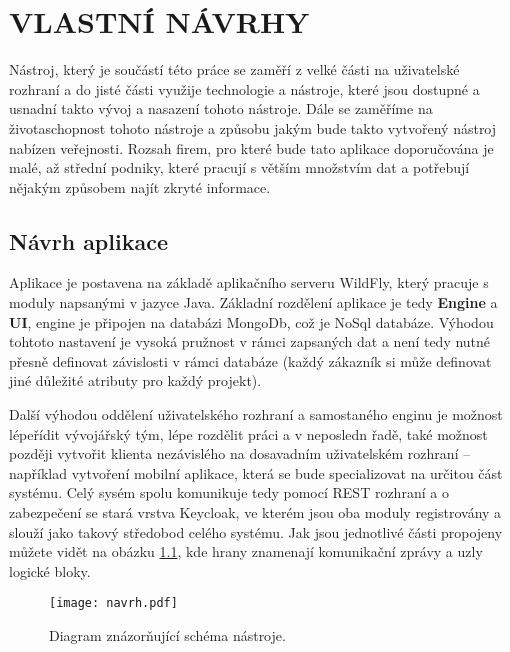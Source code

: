 \chapter{VLASTNÍ NÁVRHY}
\par Nástroj, který je součástí této práce se zaměří z velké části na uživatelské rozhraní a do jisté části využije technologie a nástroje, které jsou dostupné a usnadní takto vývoj a nasazení tohoto nástroje. Dále se zaměříme na životaschopnost tohoto nástroje a způsobu jakým bude takto vytvořený nástroj nabízen veřejnosti. Rozsah firem, pro které bude tato aplikace doporučována je malé, až střední podniky, které pracují s větším množstvím dat a potřebují nějakým způsobem najít zkryté informace.

\section{Návrh aplikace}
\par Aplikace je postavena na základě aplikačního serveru WildFly, který pracuje s moduly napsanými v jazyce Java. Základní rozdělení aplikace je tedy \textbf{Engine} a \textbf{UI}, engine je připojen na databázi MongoDb, což je NoSql databáze. Výhodou tohtoto nastavení je vysoká pružnost v rámci zapsaných dat a není tedy nutné  přesně definovat závislosti v rámci databáze (každý zákazník si může definovat jiné důležité atributy pro každý projekt).
\par Další výhodou oddělení uživatelského rozhraní a samostaného enginu je možnost lépeřídit vývojářský tým, lépe rozdělit práci a v neposledn řadě, také možnost později vytvořit klienta nezávislého na dosavadním uživatelském rozhraní -- například vytvoření mobilní aplikace, která se bude specializovat na určitou část systému. Celý sysém spolu komunikuje tedy pomocí REST rozhraní a o zabezpečení se stará vrstva Keycloak, ve kterém jsou oba moduly registrovány a slouží jako takový středobod celého systému. Jak jsou jednotlivé části propojeny můžete vidět na obázku \ref{schema}, kde hrany znamenají komunikační zprávy a uzly logické bloky.

\begin{figure}[!htp]
  \centering
  \texttt{[image: navrh.pdf]}
  \caption{Diagram znázorňující schéma nástroje.}
  \label{schema}
\end{figure}

